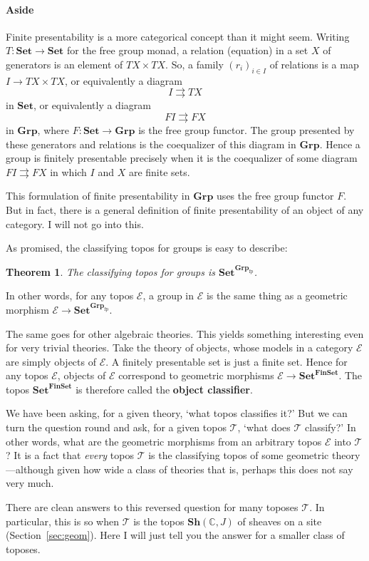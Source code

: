 \documentclass[12pt]{article}
\newcommand{\cat}[1]{\mathscr{#1}}
\newcommand{\fcat}[1]{\mathbf{#1}}
\newcommand{\Set}{\fcat{Set}}
\newcommand{\parpairu}{\rightrightarrows}
\newcommand{\demph}[1]{\textbf{\textup{#1}}}
\newcommand{\scat}[1]{\mathbb{#1}}
\newcommand{\E}{\cat{E}}
\newcommand{\T}{\cat{T}}
\newcommand{\Sh}{\fcat{Sh}}
\newcommand{\FinSet}{\fcat{FinSet}}
\newcommand{\fp}{\mathrm{fp}}
\newcommand{\Gp}{\fcat{Grp}}
\newcommand{\cln}{\colon}
\newtheorem{thm}{Theorem}[section]
\begin{document}
\paragraph*{Aside} Finite presentability is a more categorical concept than it
might seem.  Writing $T\cln \Set \to \Set$ for the free group monad, a relation
(equation) in a set $X$ of generators is an element of $TX \times TX$.  So, a
family $(r_i)_{i \in I}$ of relations is a map $I \to TX \times TX$, or
equivalently a diagram 
\[
I \parpairu TX
\]
in $\Set$, or equivalently a diagram 
\[
FI \parpairu FX
\]
in $\Gp$, where $F\cln \Set \to \Gp$ is the free group functor.  The group
presented by these generators and relations is the coequalizer of this diagram
in $\Gp$.  Hence a group is finitely presentable precisely when it is the
coequalizer of some diagram $FI \parpairu FX$ in which $I$ and $X$ are finite
sets.  

This formulation of finite presentability in $\Gp$ uses the free group functor
$F$.  But in fact, there is a general definition of finite presentability of
an object of any category.  I will not go into this.

\bigskip

As promised, the classifying topos for groups is easy to describe:
% 
\begin{thm}
The classifying topos for groups is $\Set^{\Gp_\fp}$.
\end{thm}
% 
In other words, for any topos $\E$, a group in $\E$ is the same thing as a
geometric morphism $\E \to \Set^{\Gp_\fp}$.  

The same goes for other algebraic theories.  This yields something
interesting even for very trivial theories.  Take the theory of objects, whose
models in a category $\E$ are simply objects of $\E$.  A finitely presentable
set is just a finite set.  Hence for any topos $\E$, objects of $\E$
correspond to geometric morphisms $\E \to \Set^{\FinSet}$.  The topos
$\Set^\FinSet$ is therefore called the \demph{object classifier}.

We have been asking, for a given theory, `what topos classifies it?'  But we
can turn the question round and ask, for a given topos $\T$, `what does $\T$
classify?'  In other words, what are the geometric morphisms from an arbitrary
topos $\E$ into $\T$?  It is a fact that \emph{every} topos $\T$ is the
classifying topos of some geometric theory---although given how wide a class
of theories that is, perhaps this does not say very much.

There are clean answers to this reversed question for many toposes $\T$.  In
particular, this is so when $\T$ is the topos $\Sh(\scat{C}, J)$ of sheaves on
a site (Section~\ref{sec:geom}).  Here I will just tell you the answer for a
smaller class of toposes.
\end{document}
